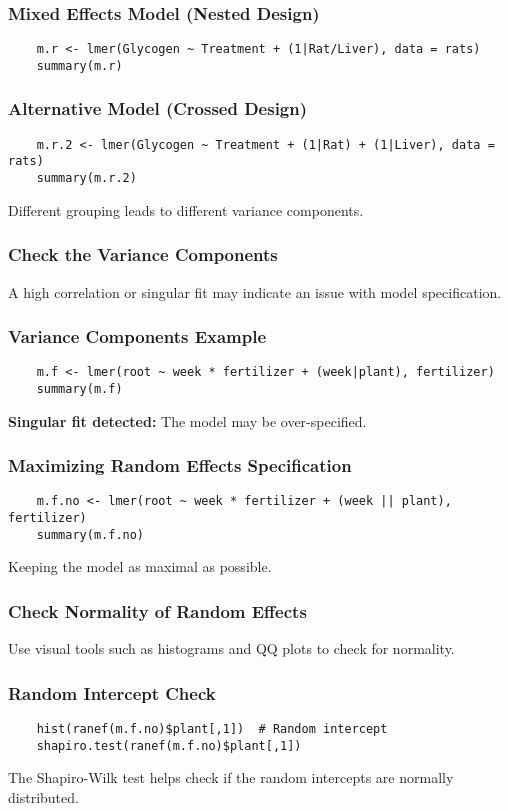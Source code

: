 \documentclass{beamer}
\begin{document}
\begin{frame}[fragile]
    \frametitle{Mixed Effects Model (Nested Design)}
    \lstset{style=Rstyle}
    \begin{lstlisting}
    m.r <- lmer(Glycogen ~ Treatment + (1|Rat/Liver), data = rats)
    summary(m.r)
    \end{lstlisting}
\end{frame}

\begin{frame}[fragile]
    \frametitle{Alternative Model (Crossed Design)}
    \lstset{style=Rstyle}
    \begin{lstlisting}
    m.r.2 <- lmer(Glycogen ~ Treatment + (1|Rat) + (1|Liver), data = rats)
    summary(m.r.2)
    \end{lstlisting}
    Different grouping leads to different variance components.
\end{frame}

\begin{frame}
    \frametitle{Check the Variance Components}
    A high correlation or singular fit may indicate an issue with model specification.
\end{frame}

\begin{frame}[fragile]
    \frametitle{Variance Components Example}
    \lstset{style=Rstyle}
    \begin{lstlisting}
    m.f <- lmer(root ~ week * fertilizer + (week|plant), fertilizer)
    summary(m.f)
    \end{lstlisting}
    \textbf{Singular fit detected:} The model may be over-specified.
\end{frame}

\begin{frame}[fragile]
    \frametitle{Maximizing Random Effects Specification}
    \lstset{style=Rstyle}
    \begin{lstlisting}
    m.f.no <- lmer(root ~ week * fertilizer + (week || plant), fertilizer)
    summary(m.f.no)
    \end{lstlisting}
    Keeping the model as maximal as possible.
\end{frame}

\begin{frame}
    \frametitle{Check Normality of Random Effects}
    Use visual tools such as histograms and QQ plots to check for normality.
\end{frame}

\begin{frame}[fragile]
    \frametitle{Random Intercept Check}
    \lstset{style=Rstyle}
    \begin{lstlisting}
    hist(ranef(m.f.no)$plant[,1])  # Random intercept
    shapiro.test(ranef(m.f.no)$plant[,1])
    \end{lstlisting}
    The Shapiro-Wilk test helps check if the random intercepts are normally distributed.
\end{frame}
\end{document}

